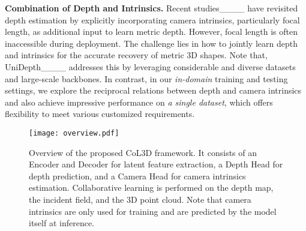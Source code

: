 \textbf{Combination of Depth and Intrinsics.}
Recent studies____ have revisited depth estimation by explicitly incorporating camera intrinsics, particularly focal length, as additional input to learn metric depth. However, focal length is often inaccessible during deployment. The challenge lies in how to jointly learn depth and intrinsics for the accurate recovery of metric 3D shapes. Note that, UniDepth____ addresses this by leveraging considerable and diverse datasets and large-scale backbones. In contrast, in our \textit{in-domain} training and testing settings, we explore the reciprocal relations between depth and camera intrinsics and also achieve impressive performance on \textit{a single dataset}, which offers flexibility to meet various customized requirements.


\begin{figure*}[t]
\begin{center}
\texttt{[image: overview.pdf]}
\end{center}
\vspace{-5mm}
\caption{Overview of the proposed CoL3D framework. It consists of an Encoder and Decoder for latent feature extraction, a Depth Head for depth prediction, and a Camera Head for camera intrinsics estimation. Collaborative learning is performed on the depth map, the incident field, and the 3D point cloud. Note that camera intrinsics are only used for training and are predicted by the model itself at inference.}
\label{fig:overview}
\vspace{-3mm}
\end{figure*}